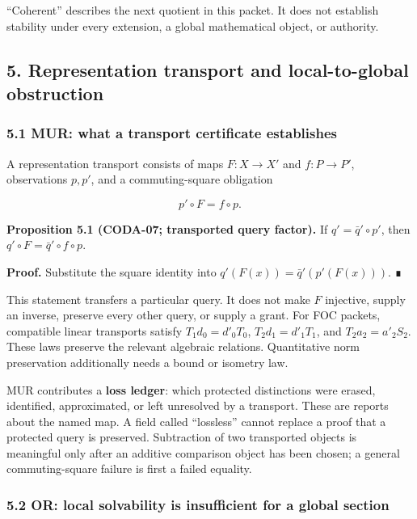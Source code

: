 \documentclass[
  11pt,
]{article}
\begin{document}
``Coherent'' describes the next quotient in this packet. It does not establish stability under every extension, a global mathematical object, or authority.

\subsection{5. Representation transport and local-to-global obstruction}\label{representation-transport-and-local-to-global-obstruction}

\subsubsection{5.1 MUR: what a transport certificate establishes}\label{mur-what-a-transport-certificate-establishes}

A representation transport consists of maps \(F:X\to X'\) and \(f:P\to P'\), observations \(p,p'\), and a commuting-square obligation

\[
 p'\circ F=f\circ p.
\]

\textbf{Proposition 5.1 (CODA-07; transported query factor).} If \(q'=\bar q'\circ p'\), then \(q'\circ F=\bar q'\circ f\circ p\).

\textbf{Proof.} Substitute the square identity into \(q'(F(x))=\bar q'(p'(F(x)))\). ∎

This statement transfers a particular query. It does not make \(F\) injective, supply an inverse, preserve every other query, or supply a grant. For FOC packets, compatible linear transports satisfy \(T_1d_0=d'_0T_0\), \(T_2d_1=d'_1T_1\), and \(T_2a_2=a'_2S_2\). These laws preserve the relevant algebraic relations. Quantitative norm preservation additionally needs a bound or isometry law.

MUR contributes a \textbf{loss ledger}: which protected distinctions were erased, identified, approximated, or left unresolved by a transport. These are reports about the named map. A field called ``lossless'' cannot replace a proof that a protected query is preserved. Subtraction of two transported objects is meaningful only after an additive comparison object has been chosen; a general commuting-square failure is first a failed equality.

\subsubsection{5.2 OR: local solvability is insufficient for a global section}\label{or-local-solvability-is-insufficient-for-a-global-section}
\end{document}
